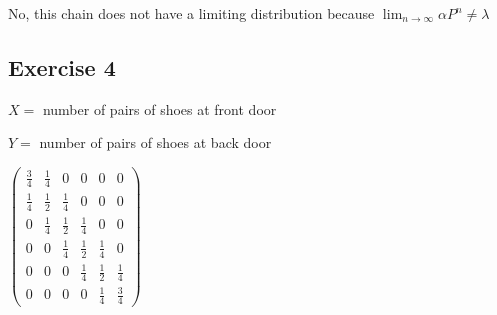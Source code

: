 \documentclass[]{article}
\begin{document}
No, this chain does not have a limiting distribution because
\(\lim_{n\to\infty} \alpha P^{n} \neq \lambda\)

\hypertarget{exercise-4}{%
\subsection{Exercise 4}\label{exercise-4}}

\(X =\) number of pairs of shoes at front door

\(Y =\) number of pairs of shoes at back door

\(\begin{pmatrix} \frac{3}{4} & \frac{1}{4} & 0 & 0 & 0 & 0 \\ \frac{1}{4} & \frac{1}{2} & \frac{1}{4} & 0 & 0 & 0 \\ 0 & \frac{1}{4} & \frac{1}{2} & \frac{1}{4} & 0 & 0 \\ 0 & 0 & \frac{1}{4} & \frac{1}{2} & \frac{1}{4} & 0 \\ 0 & 0 & 0 & \frac{1}{4} & \frac{1}{2} & \frac{1}{4} \\ 0 & 0 & 0 & 0 & \frac{1}{4} & \frac{3}{4} \end{pmatrix}\)
\end{document}
